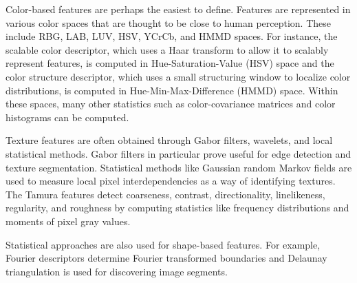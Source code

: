 Color-based features are perhaps the easiest to define. Features are represented in various color spaces that are thought to be close to human perception. These include RBG, LAB, LUV, HSV, YCrCb, and HMMD spaces. For instance, the scalable color descriptor, which uses a Haar transform to allow it to scalably represent features, is computed in Hue-Saturation-Value (HSV) space and the color structure descriptor, which uses a small structuring window to localize color distributions, is computed in Hue-Min-Max-Difference (HMMD) space. Within these spaces, many other statistics such as color-covariance matrices and color histograms can be computed. 

Texture features are often obtained through Gabor filters, wavelets, and local statistical methods. Gabor filters in particular prove useful for edge detection and texture segmentation.\cite{weldon1996efficient}\cite{mehrotra1992gabor} Statistical methods like Gaussian random Markov fields are used to measure local pixel interdependencies as a way of identifying textures.\cite{porter1997robust} The Tamura features detect coarseness, contrast, directionality, linelikeness, regularity, and roughness by computing statistics like frequency distributions and moments of pixel gray values.\cite{tamura1978textural}

Statistical approaches are also used for shape-based features. For example, Fourier descriptors determine Fourier transformed boundaries and Delaunay triangulation is used for discovering image segments.


